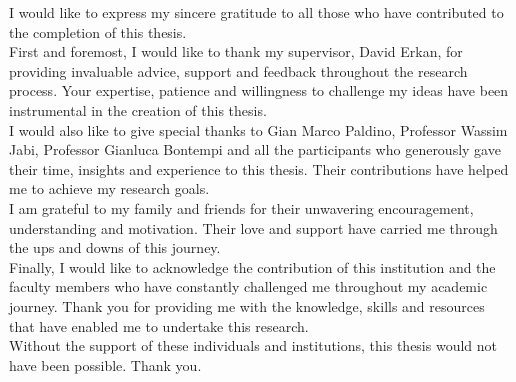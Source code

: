 \documentclass[a4paper, 12pt]{report}
\begin{document}
\clearpage
\vspace*{\fill}
{}
I would like to express my sincere gratitude to all those who have contributed to the completion of this thesis.\\

First and foremost, I would like to thank my supervisor, David Erkan, for providing invaluable advice, support and feedback throughout the research process. Your expertise, patience and willingness to challenge my ideas have been instrumental in the creation of this thesis.\\

I would also like to give special thanks to Gian Marco Paldino, Professor Wassim Jabi, Professor Gianluca Bontempi and all the participants who generously gave their time, insights and experience to this thesis. Their contributions have helped me to achieve my research goals.\\

I am grateful to my family and friends for their unwavering encouragement, understanding and motivation. Their love and support have carried me through the ups and downs of this journey.\\

Finally, I would like to acknowledge the contribution of this institution and the faculty members who have constantly challenged me throughout my academic journey. Thank you for providing me with the knowledge, skills and resources that have enabled me to undertake this research.\\

Without the support of these individuals and institutions, this thesis would not have been possible. Thank you.
\vspace*{\fill}
\clearpage

\cleardoublepage
{}
{}
\listoffigures

\cleardoublepage
{}
{}
\listoftables

\printglossary
\printglossary[type=\acronymtype]
\cleardoublepage
{}

\end{document}
